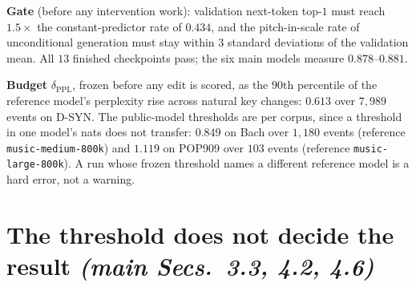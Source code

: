 \documentclass{article}
\begin{document}
%
\textbf{Gate} (before any intervention work): validation next-token top-$1$ must reach
$1.5\times$ the constant-predictor rate of $0.434$, and the pitch-in-scale rate of
unconditional generation must stay within $3$ standard deviations of the validation
mean. All $13$ finished checkpoints pass; the six main models measure
$0.878$--$0.881$.

\textbf{Budget} $\delta_{\text{PPL}}$, frozen before any edit is scored, as the
$90$th percentile of the reference model's perplexity rise across natural key changes:
$0.613$ over $7{,}989$ events on D-SYN. The public-model thresholds are per corpus, since
a threshold in one model's nats does not transfer: $0.849$ on Bach over $1{,}180$ events
(reference \texttt{music-medium-800k}) and $1.119$ on POP909 over $103$ events
(reference \texttt{music-large-800k}). A run whose frozen threshold names a different
reference model is a hard error, not a warning.

\section{The threshold does not decide the result \normalfont\textit{(main Secs.~3.3, 4.2, 4.6)}}
\label{sec:threshold}
\end{document}
